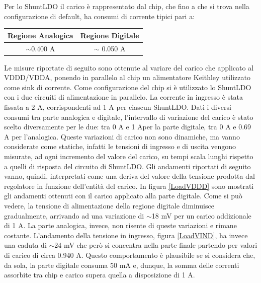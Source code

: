 Per lo ShuntLDO il carico è rappresentato dal chip, che fino a che si trova nella configurazione di default, ha consumi di corrente tipici pari a:
\begin{center}
\begin{tabular}{cc}
\hline
Regione Analogica & Regione Digitale \\ \hline
$\sim$0.400 A & $\sim$ 0.050 A\\ \hline     
\end{tabular}
\end{center}
Le misure riportate di seguito sono ottenute al variare del carico che applicato al VDDD/VDDA, ponendo in parallelo al chip un alimentatore Keithley utilizzato come sink di corrente. 
Come configurazione del chip si è utilizzato lo ShuntLDO con i due circuiti di alimentazione in parallelo. 
La corrente in ingresso è stata fissata a 2 A, corrispondenti ad 1 A per ciascun ShuntLDO. 
Dati i diversi consumi tra parte analogica e digitale, l'intervallo di variazione del carico è stato scelto diversamente per le due: tra 0 A e 1 Aper la parte digitale, tra 0 A e 0.69 A per l'analogica. 
Queste variazioni di carico non sono dinamiche, ma vanno considerate come statiche, infatti le tensioni di ingresso e di uscita vengono misurate, ad ogni incremento del valore del carico, su tempi scala lunghi rispetto a quelli di risposta del circuito di ShuntLDO. 
Gli andamenti riportati di seguito vanno, quindi, interpretati come una deriva del valore della tensione prodotta dal regolatore in funzione dell'entità del carico. 
In figura \ref{LoadVDDD} sono mostrati gli andamenti ottenuti con il carico applicato alla parte digitale.
Come si può vedere, la tensione di alimentazione della regione digitale diminuisce gradualmente, arrivando ad una variazione di $\sim$18 mV per un carico addizionale di 1 A.
La parte analogica, invece, non risente di queste variazioni e rimane costante. %
L'andamento della tensione in ingresso, figura \ref{LoadVIND}, ha invece una caduta di $\sim$24 mV che però si concentra nella parte finale partendo per valori di carico di circa 0.940 A.
Questo comportamento è plausibile se si considera che, da sola, la parte digitale consuma 50 mA e, dunque, la somma delle correnti assorbite tra chip e carico supera  quella a disposizione di 1 A. 
